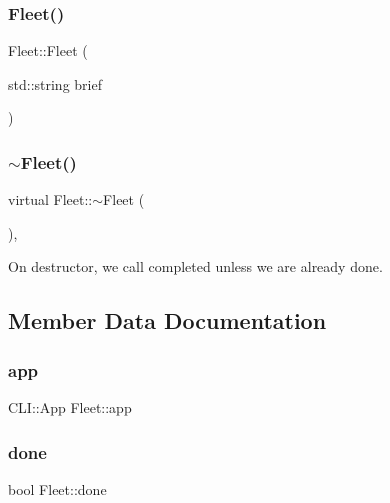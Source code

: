 \subsubsection{\texorpdfstring{Fleet()}{Fleet()}}
{\footnotesize\ttfamily Fleet\+::\+Fleet (\begin{DoxyParamCaption}\item[{std\+::string}]{brief }\end{DoxyParamCaption})\hspace{0.3cm}{\ttfamily [inline]}}

\mbox{\label{class_fleet_a16b92c30ec373acb143b8521f632ec3a}} 
\subsubsection{\texorpdfstring{$\sim$\+Fleet()}{~Fleet()}}
{\footnotesize\ttfamily virtual Fleet\+::$\sim$\+Fleet (\begin{DoxyParamCaption}{ }\end{DoxyParamCaption})\hspace{0.3cm}{\ttfamily [inline]}, {\ttfamily [virtual]}}



On destructor, we call completed unless we are already done. 



\subsection{Member Data Documentation}
\mbox{\label{class_fleet_a6af91781ed20b1046e5e90042d6660a0}} 
\subsubsection{\texorpdfstring{app}{app}}
{\footnotesize\ttfamily C\+L\+I\+::\+App Fleet\+::app}

\mbox{\label{class_fleet_a58375961c9aa0b4249039b36fef7b20f}} 
\subsubsection{\texorpdfstring{done}{done}}
{\footnotesize\ttfamily bool Fleet\+::done}

